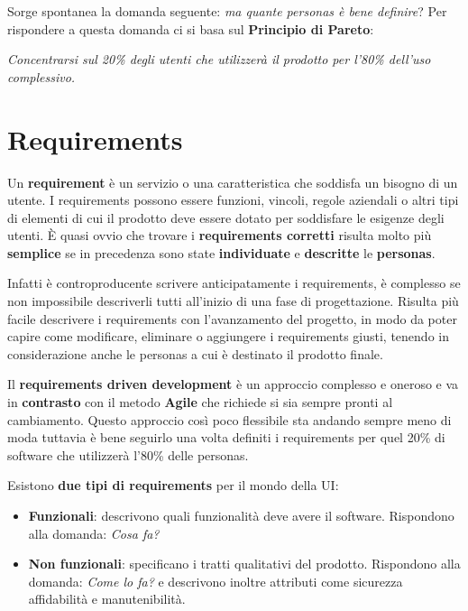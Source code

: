 Sorge spontanea la domanda seguente: \textit{ma quante personas è bene definire}?
Per rispondere a questa domanda ci si basa sul \textbf{Principio di Pareto}: 
\begin{center}
	\textit{Concentrarsi sul 20\% degli utenti che utilizzerà il prodotto per l'80\% dell'uso complessivo.}
\end{center}

\pagebreak

\section{Requirements}

Un \textbf{requirement} è un servizio o una caratteristica che soddisfa un bisogno di un utente.
I requirements possono essere funzioni, vincoli, regole aziendali o altri tipi di elementi di cui il prodotto deve essere dotato per soddisfare le esigenze degli utenti. È quasi ovvio che trovare i \textbf{requirements corretti} risulta molto più \textbf{semplice} se in precedenza sono state \textbf{individuate} e \textbf{descritte} le \textbf{personas}.

Infatti è controproducente scrivere anticipatamente i requirements,
è complesso se non impossibile descriverli tutti all'inizio di una fase di progettazione. Risulta più facile descrivere i requirements con l'avanzamento del progetto, in modo da poter capire come modificare, eliminare o aggiungere i requirements giusti, tenendo in considerazione anche le personas a cui è destinato il prodotto finale.

Il \textbf{requirements driven development} è un approccio complesso e oneroso e va in \textbf{contrasto} con il metodo \textbf{Agile} che richiede si sia sempre pronti al cambiamento. Questo approccio così poco flessibile sta andando sempre meno di moda tuttavia è bene seguirlo una volta definiti i requirements per quel 20\% di software che utilizzerà l'80\% delle personas.

Esistono \textbf{due tipi di requirements} per il mondo della UI:

\begin{itemize}
	\item \textbf{Funzionali}:
	      descrivono quali funzionalità deve avere il software. Rispondono alla domanda:
	      \textit{Cosa fa?}
	\item \textbf{Non funzionali}: specificano i tratti qualitativi del prodotto. Rispondono alla domanda: \textit{Come lo fa?} e descrivono inoltre
	      attributi come sicurezza affidabilità e manutenibilità.
\end{itemize}

